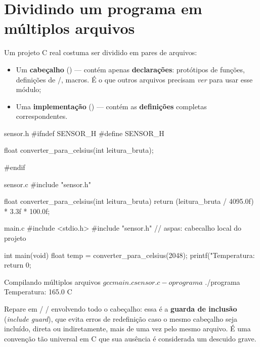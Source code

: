 \section{Dividindo um programa em múltiplos arquivos}

Um projeto C real costuma ser dividido em pares de arquivos:

\begin{itemize}
    \item Um \textbf{cabeçalho} () — contém apenas \textbf{declarações}: protótipos de funções, definições de /, macros. É o que outros arquivos precisam \emph{ver} para usar esse módulo;
    \item Uma \textbf{implementação} () — contém as \textbf{definições} completas correspondentes.
\end{itemize}

\begin{codigoc}{sensor.h}
#ifndef SENSOR_H
#define SENSOR_H

float converter_para_celsius(int leitura_bruta);

#endif
\end{codigoc}

\begin{codigoc}{sensor.c}
#include "sensor.h"

float converter_para_celsius(int leitura_bruta) {
    return (leitura_bruta / 4095.0f) * 3.3f * 100.0f;
}
\end{codigoc}

\begin{codigoc}{main.c}
#include <stdio.h>
#include "sensor.h"   // aspas: cabecalho local do projeto

int main(void) {
    float temp = converter_para_celsius(2048);
    printf("Temperatura: %
    return 0;
}
\end{codigoc}

\begin{codigobash}{Compilando múltiplos arquivos}
$ gcc main.c sensor.c -o programa
$ ./programa
Temperatura: 165.0 C
\end{codigobash}

Repare em  /  /  envolvendo todo o cabeçalho: essa é a \textbf{guarda de inclusão} (\emph{include guard}), que evita erros de redefinição caso o mesmo cabeçalho seja incluído, direta ou indiretamente, mais de uma vez pelo mesmo arquivo. É uma convenção tão universal em C que sua ausência é considerada um descuido grave.

